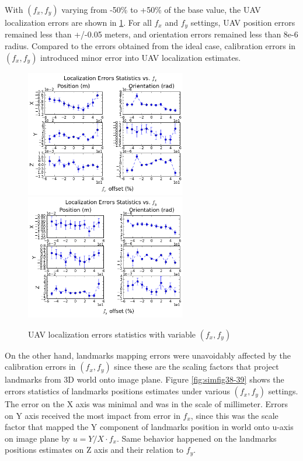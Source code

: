 With $(f_x, f_y)$ varying from -50\% to +50\% of the base value, the
UAV localization errors are shown in \ref{fig:simfig43-44}. For all
$f_x$ and $f_y$ settings, UAV position errors remained less than
+/-0.05 meters, and orientation errors remained less than 8e-6 radius.
Compared to the errors obtained from the ideal case, calibration
errors in $(f_x, f_y)$ introduced minor error into UAV localization
estimates.
\begin{figure}[h]
  \centering
  \includegraphics[width=7cm,keepaspectratio=true]{./Figures/SimulationFigures/Figure43.png}
  \includegraphics[width=7cm,keepaspectratio=true]{./Figures/SimulationFigures/Figure44.png}
  \caption{UAV localization errors statistics with variable $(f_x, f_y)$}
  \label{fig:simfig43-44}
\end{figure}

On the other hand, landmarks mapping errors were unavoidably affected
by the calibration errors in $(f_x, f_y)$ since these are the scaling
factors that project landmarks from 3D world onto image plane.
Figure \ref{fig:simfig38-39} shows the errors statistics of landmarks
positions estimates under various $(f_x, f_y)$ settings. The error on
the X axis was minimal and was in the scale of millimeter. Errors on Y
axis received the most impact from error in $f_x$, since this was the
scale factor that mapped the Y component of landmarks position in
world onto u-axis on image plane by $u = Y/X \cdot f_x$. Same behavior
happened on the landmarks positions estimates on Z axis and their
relation to $f_y$.

